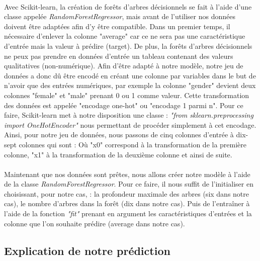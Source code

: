 \paragraph{}Avec Scikit-learn, la création de forêts d'arbres décisionnels se fait à l'aide d'une classe appelée \textit{RandomForestRegressor}, mais avant de l'utiliser nos données doivent être adaptées afin d'y être compatible. Dans un premier temps, il nécessaire d'enlever la colonne "average" car ce ne sera pas une caractéristique d'entrée mais la valeur à prédire (target). De plus, la forêts d'arbres décisionnels ne peux pas prendre en données d'entrée un tableau contenant des valeurs qualitatives (non-numérique). Afin d'être adapté à notre modèle, notre jeu de données a donc dû être encodé en créant une colonne par variables dans le but de n'avoir que des entrées numériques, par exemple la colonne "gender" devient deux colonnes "female" et "male" prenant 0 ou 1 comme valeur. Cette transformation des données est appelée "encodage one-hot" ou "encodage 1 parmi n". Pour ce faire, Scikit-learn met à notre disposition une classe : \textit{"from sklearn.preprocessing import OneHotEncoder"} nous permettant de procéder simplement à cet encodage. Ainsi, pour notre jeu de données, nous passons de cinq colonnes d'entrée à dix-sept colonnes qui sont : \medbreak
Où "x0" correspond à la transformation de la première colonne, "x1" à la transformation de la deuxième colonne et ainsi de suite.

\paragraph{}Maintenant que nos données sont prêtes, nous allons créer notre modèle à l'aide de la classe \textit{RandomForestRegressor}. Pour ce faire, il nous suffit de l'initialiser en choisissant, pour notre cas, : la profondeur maximale des arbres (six dans notre cas), le nombre d'arbres dans la forêt (dix dans notre cas). Puis de l'entraîner à l'aide de la fonction \textit{"fit"} prenant en argument les caractéristiques d'entrées et la colonne que l'on souhaite prédire (average dans notre cas).

\subsection{Explication de notre prédiction}
